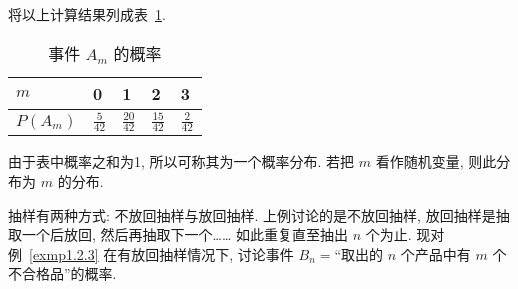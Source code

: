 \begin{solution}
  将以上计算结果列成表~\ref{tab1.2.4}.
  \begin{table}[h]
    \centering
    \caption{事件 $A_m$ 的概率}\label{tab1.2.4}
    \begin{tabularx}{0.9\linewidth}{*{5}{X}}
      \toprule
      $m$ & 0 & 1 & 2 & 3\\
      \midrule
      $P (A _m)$ & $\frac{5}{42}$ & $\frac{20}{42}$ & $\frac{15}{42}$ & $\frac{2}{42}$\\
      \bottomrule
    \end{tabularx}
  \end{table}
  由于表中概率之和为1,
  所以可称其为一个概率分布.
  若把 $m$ 看作随机变量,
  则此分布为 $m$ 的分布.
\end{solution}

\begin{example}[放回抽样]
  抽样有两种方式:
  不放回抽样与放回抽样.
  上例讨论的是不放回抽样,
  放回抽样是抽取一个后放回,
  然后再抽取下一个……
  如此重复直至抽出 $n$ 个为止.
  现对例~\ref{exmp1.2.3} 在有放回抽样情况下,
  讨论事件 $B _n=$“取出的 $n$ 个产品中有 $m$ 个不合格品”的概率.
\end{example}

